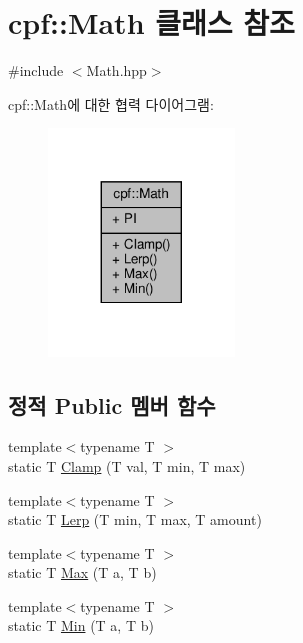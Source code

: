 \hypertarget{classcpf_1_1_math}{}\section{cpf\+:\+:Math 클래스 참조}
\label{classcpf_1_1_math}


{\ttfamily \#include $<$Math.\+hpp$>$}



cpf\+:\+:Math에 대한 협력 다이어그램\+:
\nopagebreak
\begin{figure}[H]
\begin{center}
\leavevmode
\includegraphics[width=140pt]{classcpf_1_1_math__coll__graph}
\end{center}
\end{figure}
\subsection*{정적 Public 멤버 함수}
\begin{DoxyCompactItemize}
\item 
{\footnotesize template$<$typename T $>$ }\\static T \hyperlink{classcpf_1_1_math_af254e4be01c64cf73906a0edf3c091e2}{Clamp} (T val, T min, T max)
\item 
{\footnotesize template$<$typename T $>$ }\\static T \hyperlink{classcpf_1_1_math_a33cf05f577c2f756b37478de7a6817bb}{Lerp} (T min, T max, T amount)
\item 
{\footnotesize template$<$typename T $>$ }\\static T \hyperlink{classcpf_1_1_math_aabd6b0e775e2a0e6eea07ab9be0bf60e}{Max} (T a, T b)
\item 
{\footnotesize template$<$typename T $>$ }\\static T \hyperlink{classcpf_1_1_math_a182737f1c3c7268808951fffb3287293}{Min} (T a, T b)
\end{DoxyCompactItemize}
